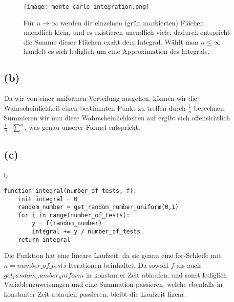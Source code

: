 \documentclass[a4paper]{scrartcl}
\begin{document}
\begin{figure}[h]
	\texttt{[image: monte\_carlo\_integration.png]}
	\caption{Für $n \rightarrow \infty$ werden die einzelnen (grün markierten) Flächen unendlich klein, und es existieren unendlich viele, dadurch entspricht die Summe dieser Flächen exakt dem Integral. Wählt man $n \leq \infty$ handelt es sich lediglich um eine Approximation des Integrals.}
\end{figure}


\subsection*{(b)}
Da wir von einer uniformen Verteilung ausgehen, können wir die Wahrscheinlichkeit einen bestimmten Punkt zu treffen durch $\frac{1}{n}$ berechnen.\\ 
Summieren wir nun diese Wahrscheinlichkeiten auf ergibt sich offensichtlich $\frac{1}{n} \cdot \sum_{}^{n}$, was genau unserer Formel entspricht.



\subsection*{(c)}b
\begin{lstlisting}
function integral(number_of_tests, f):
	init integral = 0
	random_number = get_random_number_uniform(0,1)
	for i in range(number_of_tests):
		y = f(random_number)
		integral += y / number_of_tests
	return integral
\end{lstlisting}
Die Funktion hat eine lineare Laufzeit, da sie genau eine for-Schleife mit $n = number\_of\_tests$ Iterationen beinhaltet. Da sowohl $f$ als auch $get_random_number_uniform$ in konstanter Zeit ablaufen, und sonst lediglich Variablenzuweisungen und eine Summation passieren, welche ebenfalls in konstanter Zeit ablaufen passieren, bleibt die Laufzeit linear.
\end{document}
